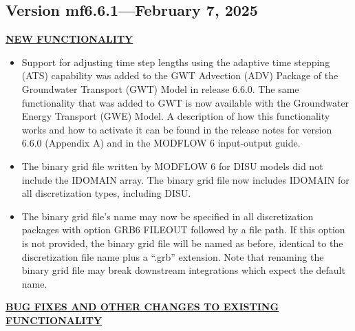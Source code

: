 	
\subsection{Version mf6.6.1---February 7, 2025}

\textbf{\underline{NEW FUNCTIONALITY}}

\begin{itemize}
	\item Support for adjusting time step lengths using the adaptive time stepping (ATS) capability was added to the GWT Advection (ADV) Package of the Groundwater Transport (GWT) Model in release 6.6.0.  The same functionality that was added to GWT is now available with the Groundwater Energy Transport (GWE) Model.  A description of how this functionality works and how to activate it can be found in the release notes for version 6.6.0 (Appendix A) and in the MODFLOW 6 input-output guide.
	\item The binary grid file written by MODFLOW 6 for DISU models did not include the IDOMAIN array.  The binary grid file now includes IDOMAIN for all discretization types, including DISU.
	\item The binary grid file's name may now be specified in all discretization packages with option GRB6 FILEOUT followed by a file path. If this option is not provided, the binary grid file will be named as before, identical to the discretization file name plus a ``.grb'' extension. Note that renaming the binary grid file may break downstream integrations which expect the default name.
\end{itemize}


\textbf{\underline{BUG FIXES AND OTHER CHANGES TO EXISTING FUNCTIONALITY}}

